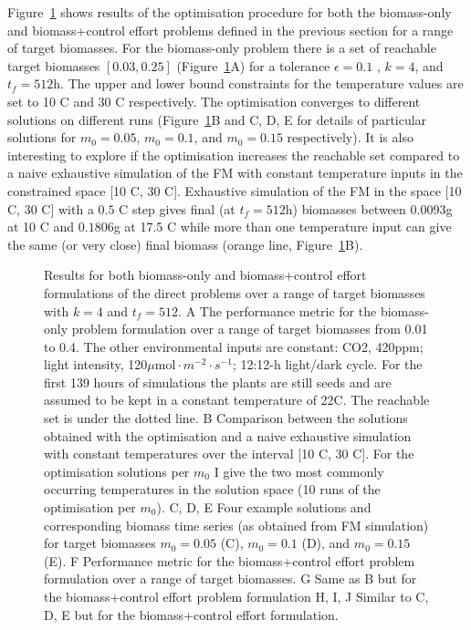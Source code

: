 Figure~\ref{fig:directPRes} shows results of the optimisation procedure for both
the biomass-only and biomass+control effort problems defined in the previous
section for a range of target biomasses. For the biomass-only problem there is a
set of reachable target biomasses $[0.03, 0.25]$ (Figure~\ref{fig:directPRes}A)
for a tolerance $\epsilon=0.1$ , $k=4$, and $t_f=512$h. The upper and lower
bound constraints for the temperature values are set to 10 \textdegree C and 30
\textdegree C respectively. The optimisation converges to different solutions on
different runs (Figure~\ref{fig:directPRes}B and C, D, E for details of
particular solutions for $m_0=0.05$, $m_0=0.1$, and $m_0=0.15$ respectively). It
is also interesting to explore if the optimisation increases the reachable set
compared to a naive exhaustive simulation of the FM with constant temperature
inputs in the constrained space [10 \textdegree C, 30 \textdegree C]. Exhaustive
simulation of the FM in the space [10 \textdegree C, 30 \textdegree C] with a
$0.5$ \textdegree C step gives final (at $t_f=512$h) biomasses between $0.0093$g
at 10 \textdegree C and $0.1806$g at 17.5 \textdegree C while more than one
temperature input can give the same (or very close) final biomass (orange line,
Figure~\ref{fig:directPRes}B).


\begin{figure}[p]
  \centering {}
  \caption{ Results for both biomass-only and biomass+control effort
    formulations of the direct problems over a range of target biomasses with
    $k=4$ and $t_f=512$. A The performance metric for the biomass-only problem
    formulation over a range of target biomasses from 0.01 to 0.4. The other
    environmental inputs are constant: CO2, 420ppm; light intensity,
    120$\mu\mathrm{mol} \cdot m^{-2} \cdot s^{-1}$; 12:12-h light/dark
    cycle. For the first 139 hours of simulations the plants are still seeds and
    are assumed to be kept in a constant temperature of 22\textdegree C. The
    reachable set is under the dotted line. B Comparison between the solutions
    obtained with the optimisation and a naive exhaustive simulation with
    constant temperatures over the interval [10 \textdegree C, 30 \textdegree
    C]. For the optimisation solutions per $m_0$ I give the two most commonly
    occurring temperatures in the solution space (10 runs of the optimisation
    per $m_0$). C, D, E Four example solutions and corresponding biomass time
    series (as obtained from FM simulation) for target biomasses $m_0=0.05$ (C),
    $m_0=0.1$ (D), and $m_0=0.15$ (E). F Performance metric for the
    biomass+control effort problem formulation over a range of target
    biomasses. G Same as B but for the biomass+control effort problem
    formulation H, I, J Similar to C, D, E but for the biomass+control effort
    formulation.}
\label{fig:directPRes}
\end{figure}

